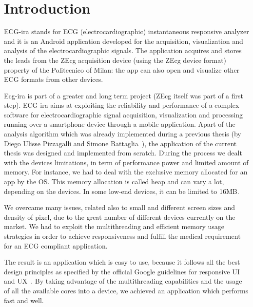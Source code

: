 
\chapter{Introduction}
\label{Chapter1} 

ECG-ira stands for ECG (electrocardiographic) instantaneous responsive analyzer and it is an Android application developed for the acquisition, visualization and analysis of the electrocardiographic signals. The application acquires and stores the leads from the ZEcg acquisition device  (using the ZEcg device format) property of the Politecnico of Milan: the app can also open and visualize other ECG formats from other devices.

Ecg-ira is part of a greater and long term project (ZEcg itself was part of a first step). ECG-ira aims at exploiting the reliability and performance of a complex software for electrocardiographic signal acquisition, visualization  and processing running over a smartphone device through a mobile application. Apart of the analysis algorithm which was already implemented during a previous thesis (by Diego Ulisse Pizzagalli and Simone Battaglia~\cite{ref3}), the application of the current thesis was designed and implemented from scratch. During the process we dealt with the devices limitations, in term of performance power and limited amount of memory. For instance, we had to deal with the exclusive memory allocated for an app by the OS. This memory allocation is called heap and can vary a lot, depending on the devices. In some low-end devices, it can be limited to 16MB.

We overcame many issues, related also to small and different screen sizes and density of pixel, due to the great number of different devices currently on the market. We had to exploit the multithreading and efficient memory usage strategies in order to achieve responsiveness and fulfill the medical requirement for an ECG compliant application.

The result is an application which is easy to use, because it follows all the best design principles as specified by the official Google guidelines for responsive UI and UX~\cite{ref27}. By taking advantage of the multithreading capabilities and the usage of all the available cores into a device, we achieved an application which performs fast and well.

